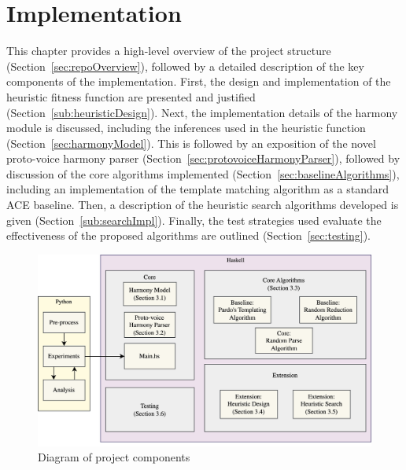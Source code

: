 \documentclass[12pt,a4paper,twoside,openany]{report} \usepackage[pdfborder={0 0 0}]{hyperref}    %
\theoremstyle{definition} \newtheorem{definition}{Definition}[section]
\begin{document}

    \chapter{Implementation}
    \label{chap:implementation}
    This chapter provides a high-level overview of the project structure (Section~\ref{sec:repoOverview}),
    followed by a detailed description of the key components of the implementation. 
    First, the design and implementation of the heuristic fitness function are presented and justified
    (Section~\ref{sub:heuristicDesign}). 
    Next, the implementation details of the harmony module is discussed, including the inferences used in
    the heuristic function (Section~\ref{sec:harmonyModel}). 
    This is followed by an exposition of the novel proto-voice harmony parser
    (Section~\ref{sec:protovoiceHarmonyParser}), followed by discussion of the core algorithms implemented (Section~\ref{sec:baselineAlgorithms}), 
    including an implementation of the template matching algorithm \cite{pardoAlgorithmsChordalAnalysis2002} as
    a standard ACE baseline. 
    Then, a description of the heuristic search algorithms developed is given (Section~\ref{sub:searchImpl}). 
    Finally, the test strategies used evaluate the effectiveness of the proposed algorithms are outlined (Section~\ref{sec:testing}).

    \begin{figure}[ht] 
    \centering 
    \includegraphics[width=\textwidth]{figs/impl/blockDiag/DissBlockDiagram.png} 
    \caption{Diagram of project components} 
    \label{fig:blockDiagram} 
    \end{figure}
\end{document}
